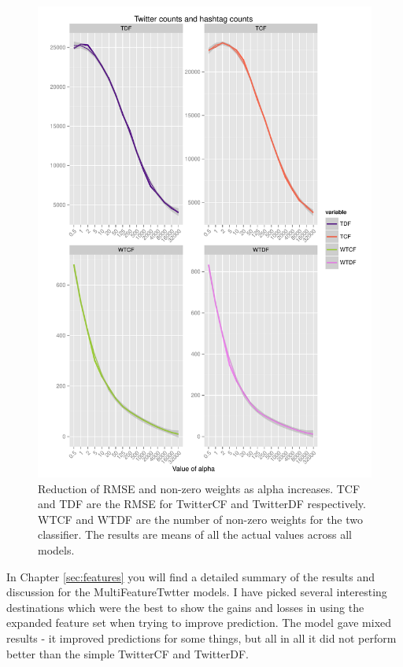 \documentclass[minf,twoside,singlespacing,parskip,frontabs]{infthesis}
\begin{document}
\begin{figure}[]
\includegraphics[scale=0.8]{wrmse}
\caption{Reduction of RMSE and non-zero weights as alpha increases. TCF and TDF are the RMSE for TwitterCF and TwitterDF respectively. WTCF and WTDF are the number of non-zero weights for the two classifier. The results are means of all the actual values across all models. }
\label{wrmse}
\end{figure}


In Chapter \ref{sec:features} you will find a detailed summary of the results and discussion for the MultiFeatureTwtter models. I have picked several interesting destinations which were the best to show the gains and losses in using the expanded feature set when trying to improve prediction. The model gave mixed results - it improved predictions for some things, but all in all it did not perform better than the simple TwitterCF and TwitterDF.
\end{document}

